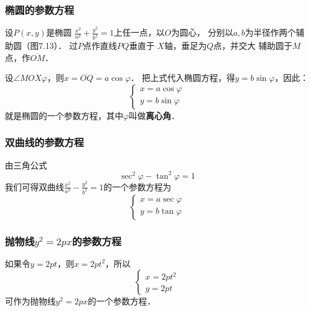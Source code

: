 \subsubsection{椭圆的参数方程}
    设$P(x,y)$是椭圆
$\frac{x^2}{a^2}+\frac{y^2}{b^2}=1$上任一点，以$O$为圆心，
分别以$a,b$为半径作两个辅助圆（图7.13）．
过$P$点作直线$PQ$垂直于
$X$轴，垂足为$Q$点，并交大
辅助圆于$M$点，作$\overline{OM}$．

设$\angle MOX\varphi$，则$x=\overline{OQ}=a\cos\varphi$．
把上式代入椭圆方程，得$y=b\sin\varphi$，因此：
\begin{equation}
    \begin{cases}
        x=a\cos\varphi\\
        y=b\sin\varphi     
    \end{cases}
\end{equation}
就是椭圆的一个参数方程，其中$\varphi$叫做\textbf{离心角}．

\subsubsection{双曲线的参数方程}

由三角公式
\[\sec^2\varphi-\tan^2\varphi=1\]
我们可得双曲线$\frac{x^2}{a^2}-\frac{y^2}{b^2}=1$的一个参数方程为
\begin{equation}
    \begin{cases}
        x=a\sec\varphi\\
       y=b\tan\varphi
    \end{cases}
\end{equation}

\subsubsection{抛物线$y^2=2px$的参数方程}

如果令$y=2pt$，则$x=2pt^2$，所以
\begin{equation}
    \begin{cases}
        x=2pt^2\\ y=2pt
    \end{cases}
\end{equation}
可作为抛物线$y^2=2px$的一个参数方程．

